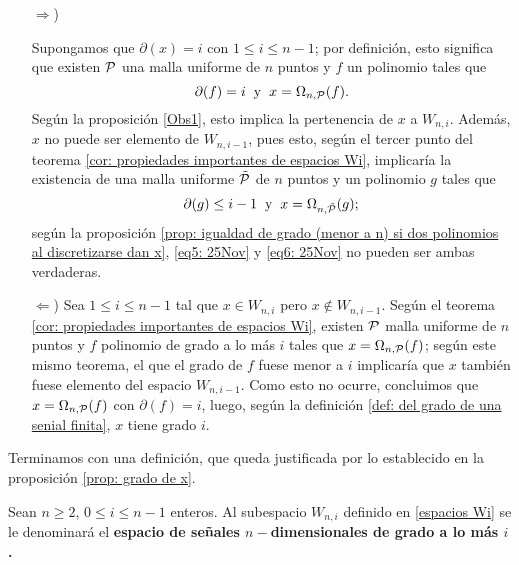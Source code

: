 \begin{itemize}
\item [$\Rightarrow$)]

Supongamos que $\partial(x)=i$ con $1 \leq i \leq n-1$;
por definición, esto significa que existen
$\mathcal{P}$ una malla uniforme de $n$ puntos y $f$ un 
polinomio 
tales que 
\begin{equation}
\label{eq5: 25Nov}
\partial(f)=i \hspace{0.2cm} \text{y} \hspace{0.2cm}
x=\Omega_{n,\mathcal{P}}(f).
\end{equation}
Según la proposición 
\ref{Obs1},
esto implica la pertenencia de $x$ a $W_{n,i}$.
Además, $x$ no puede ser elemento de $W_{n,i-1}$,
pues esto,
según el tercer punto del teorema
\ref{cor: propiedades importantes de espacios Wi},
implicaría la existencia de una
malla uniforme $\tilde{\mathcal{P}}$ de $n$
puntos y un polinomio $g$ tales que
\begin{equation}
\label{eq6: 25Nov}
\partial(g)\leq i-1 \hspace{0.2cm} \text{y} \hspace{0.2cm}
x=\Omega_{n,\tilde{\mathcal{P}}}(g);
\end{equation}
según la proposición
\ref{prop: igualdad de grado (menor a n) si dos polinomios al discretizarse dan x}, \eqref{eq5: 25Nov}
y \eqref{eq6: 25Nov} no pueden ser ambas verdaderas.

\item[$\Leftarrow$)] Sea
$1 \leq i \leq n-1$ tal que $x \in W_{n,i}$
pero $x \not\in W_{n,i-1}$.
Según el teorema
\ref{cor: propiedades importantes de espacios Wi}, existen
$\mathcal{P}$ malla uniforme de $n$ puntos y
$f$ polinomio de grado a lo más $i$ tales que
$x= \Omega_{n, \mathcal{P}}(f)$; según este mismo
teorema, el que el grado de $f$ fuese menor a $i$
implicaría que $x$ también fuese elemento
del espacio $W_{n,i-1}$. Como esto no ocurre, concluimos
que $x= \Omega_{n, \mathcal{P}}(f)$
con $\partial(f)=i$, luego, según la definición
\ref{def: del grado de una senial finita}, 
$x$ tiene grado $i$. \QEDB
\end{itemize}
\vspace{0.2cm}

Terminamos con una definición, que queda justificada
por lo establecido en la proposición \ref{prop: grado de x}.

\begin{defi}
Sean $n \geq 2$, $0 \leq i \leq n-1$ enteros. 
Al subespacio $W_{n,i}$ definido en \eqref{espacios Wi}
se le denominará el \textbf{espacio de señales $n-$dimensionales
de grado a lo más $i$.}
\end{defi}



